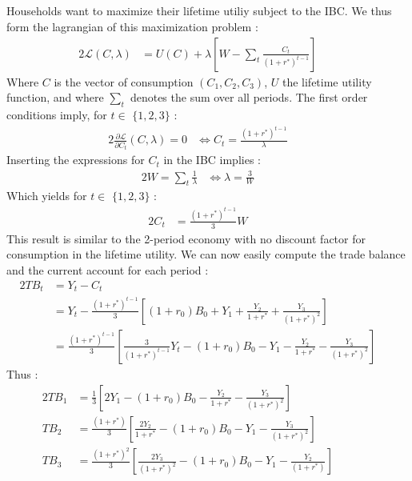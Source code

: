 \documentclass{article}
\begin{document}
\subsection{}
Households want to maximize their lifetime utiliy subject to the IBC. We thus form the lagrangian of this maximization problem :
\begin{alignat}{2}
    \mathcal{L}(C,\lambda) &= U(C) + \lambda \left[ W - \sum_t \frac{C_t}{(1+r^*)^{t-1}} \right] \quad&
\end{alignat}
Where $C$ is the vector of consumption $(C_1, C_2, C_3)$, $U$ the lifetime utility function, and where $\displaystyle\sum_t$ denotes the sum over all periods.\newline
The first order conditions imply, for $t \in$ $\{ 1, 2, 3\}$ :
\begin{alignat*}{2}
    \frac{\partial\mathcal{L}}{\partial C_t} (C,\lambda) = 0 &\iff C_t = \frac{(1+r^*)^{t-1}}{\lambda} \quad&
\end{alignat*}
Inserting the expressions for $C_t$ in the IBC implies :
\begin{alignat}{2}
    W = \sum_t \frac{1}{\lambda} &\iff \lambda = \frac{3}{W}\quad&
\end{alignat}
Which yields for $t \in$ $\{ 1, 2, 3\}$ :
\begin{alignat}{2}
    C_t &= \frac{(1+r^*)^{t-1}}{3}W\quad&
\end{alignat}
This result is similar to the 2-period economy with no discount factor for consumption in the lifetime utility.\newline
We can now easily compute the trade balance and the current account for each period :
\begin{alignat*}{2}
    TB_t &= Y_t - C_t\quad&\\
    &= Y_t - \frac{(1+r^*)^{t-1}}{3} \left[ (1+r_0)B_0 + Y_1 + \frac{Y_2}{1+r^*} + \frac{Y_3}{(1+r^*)^2} \right]\quad&\\
    &= \frac{(1+r^*)^{t-1}}{3} \left[\frac{3}{(1+r^*)^{t-1}}Y_t - (1+r_0)B_0 - Y_1 - \frac{Y_2}{1+r^*} - \frac{Y_3}{(1+r^*)^2} \right]\quad&
\end{alignat*}
Thus :
\begin{alignat}{2}
    TB_1 &= \frac{1}{3} \left[2 Y_1 -(1+r_0)B_0 - \frac{Y_2}{1+r^*} - \frac{Y_3}{(1+r^*)^2} \right]\quad&\quad&\\
    TB_2 &= \frac{(1+r^*)}{3} \left[\frac{2Y_2}{1+r^*} - (1+r_0)B_0 - Y_1 - \frac{Y_3}{(1+r^*)^2} \right]\quad&\\
    TB_3 &= \frac{(1+r^*)^2}{3} \left[\frac{2Y_3}{(1+r^*)^2} - (1+r_0)B_0 - Y_1 - \frac{Y_2}{(1+r^*)} \right]\quad&
\end{alignat}
\end{document}

